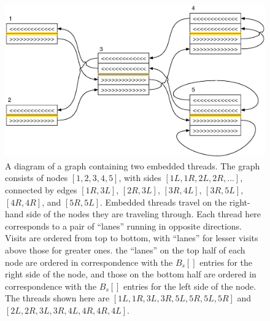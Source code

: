 \begin{figure}[h!]
\centering
\includegraphics[width=\linewidth]{figures/03_gpbwt/highwaydiagram.eps}
\caption{A diagram of a graph containing two embedded threads. The graph consists of nodes $[1, 2, 3, 4, 5]$, with sides $[1L, 1R, 2L, 2R, \ldots]$, connected by edges $[1R, 3L]$, $[2R, 3L]$, $[3R, 4L]$, $[3R, 5L]$, $[4R, 4R]$, and $[5R, 5L]$. Embedded threads travel on the right-hand side of the nodes they are traveling through. Each thread here corresponds to a pair of ``lanes'' running in opposite directions. Visits are ordered from top to bottom, with ``lanes'' for lesser visits above those for greater ones. the ``lanes'' on the top half of each node are ordered in correspondence with the $B_s[]$ entries for the right side of the node, and those on the bottom half are ordered in correspondence with the $B_s[]$ entries for the left side of the node. The threads shown here are $[1L, 1R, 3L, 3R, 5L, 5R, 5L, 5R]$ and $[2L, 2R, 3L, 3R, 4L, 4R, 4R, 4L]$.}
\label{fig:highwaydiagram}
\end{figure}

